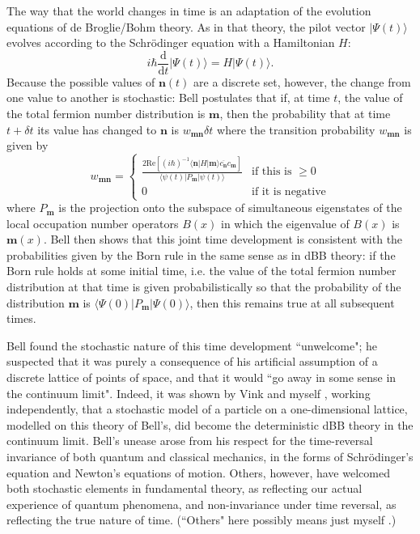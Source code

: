 \documentclass[12pt,reqno]{article}
\newcommand{\be}{\begin{equation}}
\newcommand{\ee}{\end{equation}}
\renewcommand{\(}{\left(}
\renewcommand{\)}{\right)}
\renewcommand{\.}{\centerdot}
\renewcommand{\d}{\text{d}}
\newcommand{\m}{\mathbf{m}}
\newcommand{\n}{\mathbf{n}}
\newcommand{\1}{\mathbf{1}}
\newcommand{\<}{\langle}
\renewcommand{\>}{\rangle}
\theoremstyle{definition}
\theoremstyle{remark}
\numberwithin{equation}{section}
\begin{document}
The way that the world changes in time is an adaptation of the evolution equations of de Broglie/Bohm theory. As in that theory, the pilot vector $|\Psi(t)\>$ evolves according to the Schr\"odinger equation with a Hamiltonian $H$:
\[
i\hbar\frac{\d}{\d t}|\Psi(t)\> = H|\Psi(t)\>.
\]
Because the possible values of $\n(t)$ are a discrete set, however, the change from one value to another is stochastic: Bell postulates that if, at time $t$, the value of the total fermion number distribution is $\m$, then the probability that at time $t + \delta t$ its value has changed to $\n$ is $w_{\m\n}\delta t$ where the transition probability $w_{\m\n}$ is given by
\be\label{Bell}
w_{\m\n} = \begin{cases} \frac{2\text{Re}[(i\hbar)^{-1}\<\n|H|\m\>\overline{c_\n}c_\m]}{\<\psi(t)|P_\m|\psi(t)\>} &\text{if this is } \ge 0\\
                       0                                                  &\text{if it is negative}
         \end{cases}
\ee 
where $P_\m$ is the projection onto the subspace of simultaneous eigenstates of the local occupation number operators $B(x)$ in which the eigenvalue of $B(x)$ is $\m(x)$. Bell then shows that this joint time development is consistent with the probabilities given by the Born rule in the same sense as in dBB theory: if the Born rule holds at some initial time, i.e. the value of the total fermion number distribution at that time is given probabilistically so that the probability of the distribution $\m$ is $\<\Psi(0)|P_\m|\Psi(0)\>$, then this remains true at all subsequent times.

Bell found the stochastic nature of this time development ``unwelcome"; he suspected that it was purely a consequence of his artificial assumption of a discrete lattice of points of space, and that it would ``go away in some sense in the continuum limit". Indeed, it was shown by Vink \cite{Vink} and myself \cite{determlimit}, working independently, that a stochastic model of a particle on a one-dimensional lattice, modelled on this theory of Bell's, did become the deterministic dBB theory in the continuum limit. Bell's unease arose from his respect for the time-reversal invariance of both quantum and classical mechanics, in the forms of Schr\"odinger's equation and Newton's equations of motion. Others, however, have welcomed both stochastic elements in fundamental theory, as reflecting our actual experience of quantum phenomena, and non-invariance under time reversal, as reflecting the true nature of time. (``Others" here possibly means just myself \cite{verdammte}.)
\end{document}
